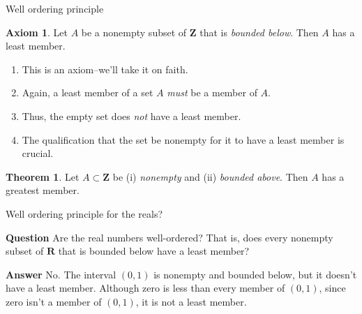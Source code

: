 \documentclass[fleqn]{beamer}
\newcommand{\reals}{\mathbf{R}}
\newcommand{\integers}{\mathbf{Z}}
\theoremstyle{definition}
\newtheorem{myth}{Theorem}
\newtheorem{myaxiom}{Axiom}
\newenvironment{numberlist}
   {\begin{enumerate}[(1)]
       \addtolength{\itemsep}{-0.5\itemsep}}
     {\end{enumerate}}
\begin{document}
\begin{frame}{Well ordering principle}

\begin{myaxiom} Let \(A\) be a nonempty subset of \(\integers\) that is \emph{bounded below}. Then \(A\) has a least member.
\end{myaxiom}

\begin{numberlist}

\item This is an axiom--we'll take it on faith.

\item Again, a least member of a set \(A\) \emph{must} be a member of \(A\).

\item Thus, the empty set does \emph{not} have a least member.

\item The qualification that the set be nonempty for it to have a least member is crucial.

\end{numberlist}


\begin{myth} Let \(A \subset \integers\) be (i) \emph{nonempty} and (ii) \emph{bounded above}. Then \(A\) has a greatest  member.
\end{myth}

\end{frame}
\begin{frame}{Well ordering principle for the reals?}

\textbf{Question} Are the real numbers well-ordered?  That is, does every 
nonempty subset of \(\reals\) that is bounded below have a least member?

\vspace{0.5in}
\textbf{Answer} No. The interval \((0,1)\) is nonempty and  bounded below, but 
it doesn't have a least member. Although zero is less than
every member of \((0,1)\), since zero isn't a member of \((0,1)\), it is 
not a least member.

\end{frame}
\end{document}

